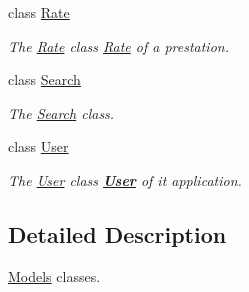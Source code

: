 \begin{DoxyCompactItemize}
class \hyperlink{classModels_1_1Rate}{Rate}
\begin{DoxyCompactList}\small\item\em The \hyperlink{classModels_1_1Rate}{Rate} class \hyperlink{classModels_1_1Rate}{Rate} of a prestation. \end{DoxyCompactList}\item 
class \hyperlink{classModels_1_1Search}{Search}
\begin{DoxyCompactList}\small\item\em The \hyperlink{classModels_1_1Search}{Search} class. \end{DoxyCompactList}\item 
class \hyperlink{classModels_1_1User}{User}
\begin{DoxyCompactList}\small\item\em The \hyperlink{classModels_1_1User}{User} class {\bfseries \hyperlink{classModels_1_1User}{User}} of it application. \end{DoxyCompactList}\end{DoxyCompactItemize}


\subsection{Detailed Description}
\hyperlink{namespaceModels}{Models} classes. 